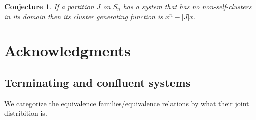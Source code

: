\documentclass[openany, a4paper, 11pt, english]{article}
\newtheorem{conjecture}[theorem]{Conjecture}
\theoremstyle{definition}
\newcommand{\Sym}{S}
\begin{document}
\begin{conjecture}
    If a partition $J$ on $\Sym_n$ has a system that has no non-self-clusters in
    its domain then its cluster generating function is $x^n-|J|x$.
\end{conjecture}

\section*{Acknowledgments}




\begin{appendices}
\section{Terminating and confluent systems}
We categorize the equivalence families/equivalence relations by what their joint
distribition is.
\begin{multicols}{2}

\end{multicols}
\end{appendices}
\end{document}

